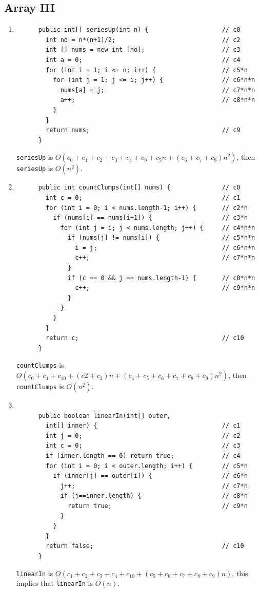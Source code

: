 \documentclass[a4paper,12pt]{article}
\begin{document}
    \subsection{Array III}
    \begin{enumerate}
      \item \begin{Verbatim}
      public int[] seriesUp(int n) {                    // c0
        int no = n*(n+1)/2;                             // c2
        int [] nums = new int [no];                     // c3
        int a = 0;                                      // c4
        for (int i = 1; i <= n; i++) {                  // c5*n
          for (int j = 1; j <= i; j++) {                // c6*n*n
            nums[a] = j;                                // c7*n*n
            a++;                                        // c8*n*n
          }
        }
        return nums;                                    // c9
      }
      \end{Verbatim}
      \texttt{seriesUp} is $O(c_0+c_1+c_2+c_3+c_4+c_9+c_5n+(c_6+c_7+c_8)n^2)$,
      then \texttt{seriesUp} is $O(n^2)$.

      \item\begin{Verbatim}
      public int countClumps(int[] nums) {              // c0
        int c = 0;                                      // c1
        for (int i = 0; i < nums.length-1; i++) {       // c2*n
          if (nums[i] == nums[i+1]) {                   // c3*n
            for (int j = i; j < nums.length; j++) {     // c4*n*n
              if (nums[j] != nums[i]) {                 // c5*n*n
                i = j;                                  // c6*n*n
                c++;                                    // c7*n*n
              }
              if (c == 0 && j == nums.length-1) {       // c8*n*n
                c++;                                    // c9*n*n
              }
            }
          }
        }
        return c;                                       // c10
      }
      \end{Verbatim}
      \texttt{countClumps} is $O(c_0+c_1+c_10+(c2+c_3)n+(c_4+c_5+c_6+c_7+c_8+c_9)n^2)$,
      then \texttt{countClumps} is $O(n^2)$.
      \item \begin{Verbatim}

      public boolean linearIn(int[] outer,
        int[] inner) {                                  // c1
        int j = 0;                                      // c2
        int c = 0;                                      // c3
        if (inner.length == 0) return true;             // c4
        for (int i = 0; i < outer.length; i++) {        // c5*n
          if (inner[j] == outer[i]) {                   // c6*n
            j++;                                        // c7*n
            if (j==inner.length) {                      // c8*n
              return true;                              // c9*n
            }
          }
        }
        return false;                                   // c10
      }
      \end{Verbatim}
      \texttt{linearIn} is $O(c_1+c_2+c_3+c_4+c_10+(c_5+c_6+c_7+c_8+c_9)n)$,
      this implies that \texttt{linearIn} is $O(n)$.


\end{enumerate}
\end{document}
